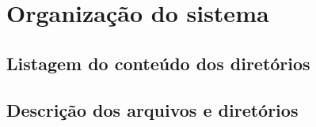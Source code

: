 %
%

\section{Organização do sistema}
\label{sec:org}

\subsection{Listagem do conteúdo dos diretórios}


\subsection{Descrição dos arquivos e diretórios}
